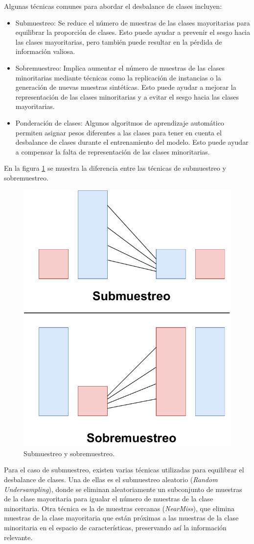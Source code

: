 Algunas técnicas comunes para abordar el desbalance de clases incluyen:
\begin{itemize}
\item Submuestreo: Se reduce el número de muestras de las clases mayoritarias para equilibrar la proporción de clases. Esto puede ayudar a prevenir el sesgo hacia las clases mayoritarias, pero también puede resultar en la pérdida de información valiosa.
\item Sobremuestreo: Implica aumentar el número de muestras de las clases minoritarias mediante técnicas como la replicación de instancias o la generación de nuevas muestras sintéticas. Esto puede ayudar a mejorar la representación de las clases minoritarias y a evitar el sesgo hacia las clases mayoritarias.
\item Ponderación de clases: Algunos algoritmos de aprendizaje automático permiten asignar pesos diferentes a las clases para tener en cuenta el desbalance de clases durante el entrenamiento del modelo. Esto puede ayudar a compensar la falta de representación de las clases minoritarias.
\end{itemize}

En la figura \ref{fig:diagDesbalance} se muestra la diferencia entre las técnicas de submuestreo y sobremuestreo.

\begin{figure}[htpb]
\centering 
\includegraphics[width=.55\textwidth]{./Figures/Desbalance.pdf}
\caption{Submuestreo y sobremuestreo.}
\label{fig:diagDesbalance}
\end{figure}

Para el caso de submuestreo, existen varias técnicas utilizadas para equilibrar el desbalance de clases. Una de ellas es el submuestreo aleatorio (\textit{Random Undersampling}), donde se eliminan aleatoriamente un subconjunto de muestras de la clase mayoritaria para igualar el número de muestras de la clase minoritaria. Otra técnica es la de muestras cercanas (\textit{NearMiss}), que elimina muestras de la clase mayoritaria que están próximas a las muestras de la clase minoritaria en el espacio de características, preservando así la información relevante.

